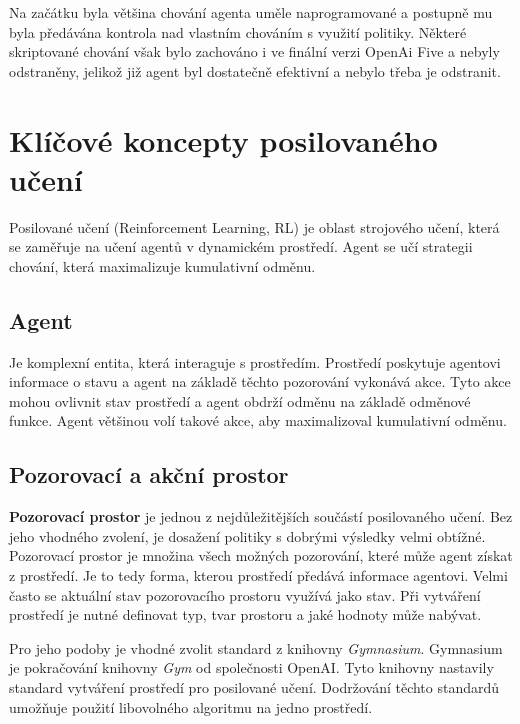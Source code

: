 Na začátku byla většina chování agenta uměle naprogramované a postupně mu byla předávána kontrola nad vlastním chováním s využití politiky.
Některé skriptované chování však bylo zachováno i ve finální verzi OpenAi Five a nebyly odstraněny, jelikož již agent byl dostatečně efektivní a nebylo třeba je odstranit.

\section{Klíčové koncepty posilovaného učení}\label{sec:klicove-koncepty-posilovaneho-uceni}
Posilované učení (Reinforcement Learning, RL) je oblast strojového učení, která se zaměřuje na učení agentů v dynamickém prostředí.
Agent se učí strategii chování, která maximalizuje kumulativní odměnu.

\subsection{Agent}\label{subsec:agent}

Je komplexní entita, která interaguje s prostředím.
Prostředí poskytuje agentovi informace o stavu a agent na základě těchto pozorování vykonává akce.
Tyto akce mohou ovlivnit stav prostředí a agent obdrží odměnu na základě odměnové funkce.
Agent většinou volí takové akce, aby maximalizoval kumulativní odměnu.

\subsection{Pozorovací a akční prostor}
\label{subsec:prostory}

\textbf{Pozorovací prostor} je jednou z nejdůležitějších součástí posilovaného učení.
Bez jeho vhodného zvolení, je dosažení politiky s dobrými výsledky velmi obtížné.
Pozorovací prostor je množina všech možných pozorování, které může agent získat z prostředí.
Je to tedy forma, kterou prostředí předává informace agentovi.
Velmi často se aktuální stav pozorovacího prostoru využívá jako stav.
Při vytváření prostředí je nutné definovat typ, tvar prostoru a jaké hodnoty může nabývat.

Pro jeho podoby je vhodné zvolit standard z knihovny \emph{Gymnasium}\cite{Gymnasium}.
Gymnasium je pokračování knihovny \textit{Gym} od společnosti OpenAI.
Tyto knihovny nastavily standard vytváření prostředí pro posilované učení.
Dodržování těchto standardů umožňuje použití libovolného algoritmu na jedno prostředí.

\bigskip

